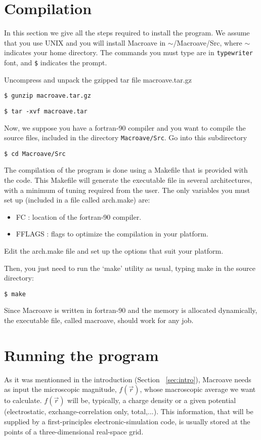 \section{Compilation}

\noindent

 In this section we give all the steps required to install
 the program. 
 We assume that you use UNIX and you will install {\sc Macroave} in 
 $\sim$/Macroave/Src, where $\sim$ indicates your home directory.
 The commands you must type are in {\tt typewriter} font, 
 and {\tt \$} indicates the prompt.

 Uncompress and unpack the gzipped tar file macroave.tar.gz

 {\tt \$ gunzip macroave.tar.gz}
 
 {\tt \$ tar -xvf macroave.tar}

 Now, we suppose you have a fortran-90 compiler and you want to compile
 the source files, included in the directory  {\tt Macroave/Src}. 
 Go into this subdirectory

 {\tt \$ cd Macroave/Src}

 The compilation of the program is done using a Makefile that is
 provided with the code. This Makefile will generate the
 executable file in several architectures, with a minimum of tuning
 required from the user. The only variables you must set up 
 (included in a file called arch.make) are:

  \begin{itemize}
    \item FC : location of the fortran-90 compiler.
    \item FFLAGS : flags to optimize the compilation in your platform.
  \end{itemize}

 Edit the arch.make file and set up the options that suit your platform. 

 Then, you just need to run the `make' utility
 as usual, typing make in the source directory:
 
 {\tt \$ make}

 Since {\sc Macroave} is written in fortran-90 and the memory 
 is allocated dynamically,
 the executable file, called macroave, should work for any job.
   
\section{Running the program}

 As it was mentionned in the introduction (Section ~\ref{sec:intro}),
 {\sc Macroave} needs as input the microscopic magnitude,
 $f \left( \vec{r} \right)$, whose macroscopic average we want to calculate. 
 $f \left( \vec{r} \right)$ will be, typically, a charge density
 or a given potential (electrostatic, exchange-correlation only, total,...). 
 This information, that will be supplied by a first-principles
 electronic-simulation code, 
 is usually stored at the points of a three-dimensional 
 real-space grid. 
 
